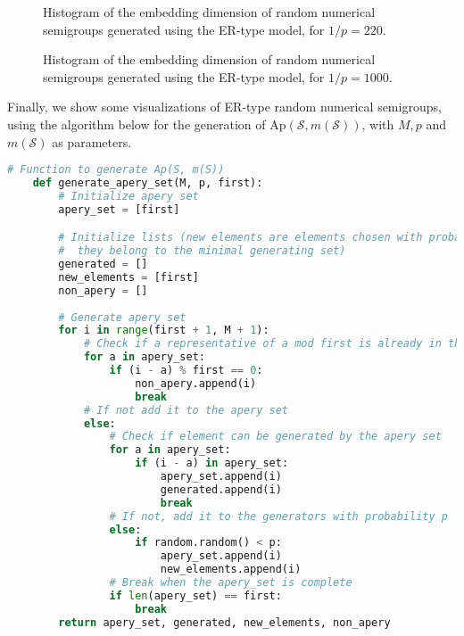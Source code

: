 \begin{figure}
    \begin{center}
        
    \end{center}
    \caption{Histogram of the embedding dimension of random numerical semigroups generated using the ER-type model, for $1/p = 220$.}
    \label{fig:embedding_hist220}
\end{figure}

\begin{figure}
    \begin{center}
        
    \end{center}
    \caption{Histogram of the embedding dimension of random numerical semigroups generated using the ER-type model, for $1/p = 1000$.}
    \label{fig:embedding_hist1000}
\end{figure}

\newpage
    
Finally, we show some visualizations of ER-type random numerical semigroups, using the algorithm below for the generation of $\mathrm{Ap}(\mathcal{S}, m(\mathcal{S}))$, with $M, p$ and $m(\mathcal{S})$ as parameters. 

\begin{lstlisting}[language=Python]
    # Function to generate Ap(S, m(S))
    def generate_apery_set(M, p, first): 
        # Initialize apery set
        apery_set = [first]

        # Initialize lists (new elements are elements chosen with probability p,
        #  they belong to the minimal generating set)
        generated = []
        new_elements = [first]
        non_apery = []
        
        # Generate apery set
        for i in range(first + 1, M + 1):
            # Check if a representative of a mod first is already in the apery set
            for a in apery_set:
                if (i - a) % first == 0:
                    non_apery.append(i)
                    break
            # If not add it to the apery set
            else:
                # Check if element can be generated by the apery set
                for a in apery_set: 
                    if (i - a) in apery_set:
                        apery_set.append(i)
                        generated.append(i)
                        break 
                # If not, add it to the generators with probability p
                else:
                    if random.random() < p:
                        apery_set.append(i)
                        new_elements.append(i)
                # Break when the apery_set is complete 
                if len(apery_set) == first:
                    break
        return apery_set, generated, new_elements, non_apery
\end{lstlisting}

